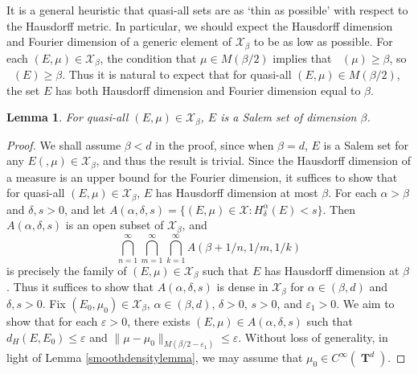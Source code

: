 \documentclass[12pt,reqno]{article}
\numberwithin{equation}{section}
\DeclareMathOperator{\hausdim}{\dim_{\mathbf{H}}}
\DeclareMathOperator{\fordim}{\dim_{\mathbf{F}}}
\DeclareMathOperator{\TT}{\mathbf{T}}
\newtheorem{lemma}{Lemma}
\begin{document}
It is a general heuristic that quasi-all sets are as `thin as possible' with respect to the Hausdorff metric. In particular, we should expect the Hausdorff dimension and Fourier dimension of a generic element of $\mathcal{X}_\beta$ to be as low as possible. For each $(E,\mu) \in \mathcal{X}_\beta$, the condition that $\mu \in M(\beta/2)$ implies that $\fordim(\mu) \geq \beta$, so $\fordim(E) \geq \beta$. Thus it is natural to expect that for quasi-all $(E,\mu) \in M(\beta/2)$, the set $E$ has both Hausdorff dimension and Fourier dimension equal to $\beta$.

\begin{lemma}
    For quasi-all $(E,\mu) \in \mathcal{X}_\beta$, $E$ is a Salem set of dimension $\beta$.
\end{lemma}
\begin{proof}
    We shall assume $\beta < d$ in the proof, since when $\beta = d$, $E$ is a Salem set for any $E(,\mu) \in \mathcal{X}_\beta$, and thus the result is trivial. Since the Hausdorff dimension of a measure is an upper bound for the Fourier dimension, it suffices to show that for quasi-all $(E,\mu) \in \mathcal{X}_\beta$, $E$ has Hausdorff dimension at most $\beta$. For each $\alpha > \beta$ and $\delta, s > 0$, and let $A(\alpha,\delta,s) = \{ (E,\mu) \in \mathcal{X}: H^\alpha_\delta(E) < s \}$. Then $A(\alpha,\delta,s)$ is an open subset of $\mathcal{X}_\beta$, and
    \[ \bigcap_{n = 1}^\infty \bigcap_{m = 1}^\infty \bigcap_{k = 1}^\infty A(\beta + 1/n, 1/m, 1/k) \]
    is precisely the family of $(E,\mu) \in \mathcal{X}_\beta$ such that $E$ has Hausdorff dimension at $\beta$.
%
    Thus it suffices to show that $A(\alpha,\delta,s)$ is dense in $\mathcal{X}_\beta$ for $\alpha \in (\beta,d)$ and $\delta, s > 0$. Fix $(E_0,\mu_0) \in \mathcal{X}_\beta$, $\alpha \in (\beta,d)$, $\delta > 0$, $s > 0$, and $\varepsilon_1 > 0$. We aim to show that for each $\varepsilon > 0$, there exists $(E,\mu) \in A(\alpha,\delta,s)$ such that $d_H(E,E_0) \leq \varepsilon$ and $\| \mu - \mu_0 \|_{M(\beta/2 - \varepsilon_1)} \leq \varepsilon$. Without loss of generality, in light of Lemma \ref{smoothdensitylemma}, we may assume that $\mu_0 \in C^\infty(\TT^d)$.


\end{proof}
\end{document}
